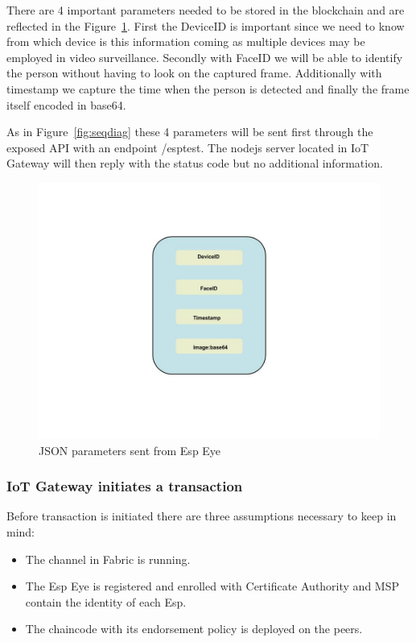 There are 4 important parameters needed to be stored in the blockchain and are reflected in the Figure~\ref{fig:json}. First the DeviceID is important since we need to know from which device is this information coming as multiple devices may be employed in video surveillance. Secondly with FaceID we will be able to identify the person without having to look on the captured frame. Additionally with timestamp we capture the time when the person is detected and finally the frame itself encoded in base64. 

As in Figure~\ref{fig:seqdiag} these 4 parameters will be sent first through the exposed API with an endpoint /esptest. The nodejs server located in IoT Gateway will then reply with the status code but no additional information. 

\begin{figure}[!htb]
    \centering
    \includegraphics[width=1\textwidth]{figures/json2.jpg}
    \caption{JSON parameters sent from Esp Eye}
    \label{fig:json}
\end{figure}
\subsubsection{IoT Gateway initiates a transaction}
Before transaction is initiated there are three assumptions necessary to keep in mind:
\begin{itemize}
    \item The channel in Fabric is running.
    \item The Esp Eye is registered and enrolled with Certificate Authority and MSP contain the identity of each Esp.
    \item The chaincode with its endorsement policy is deployed on the peers.
\end{itemize}



